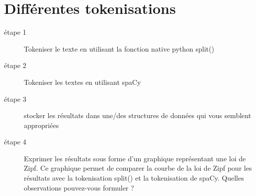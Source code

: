 \vspace{0.5cm}
\section{Différentes tokenisations}
\vspace{0.5cm}

\begin{description}
\item [étape 1] Tokeniser le texte en utilisant la fonction native python split()
  \item [étape 2] Tokeniser les textes en utilisant spaCy
 \item [étape 3] stocker les résultats dans une/des structures de données qui vous semblent appropriées
 \item [étape 4] Exprimer les résultats sous forme d'un graphique représentant une loi de Zipf. Ce graphique permet de comparer la courbe de la loi de Zipf pour les résultats avec la tokenisation split() et la tokenisation de spaCy. Quelles observations pouvez-vous formuler ?
\end{description}



\vspace{0.5cm}

\begin{python}

\end{python}



 \begin{python}   
  
 \end{python}
    
   

\begin{center}

\noindent{}
	\end{center}
